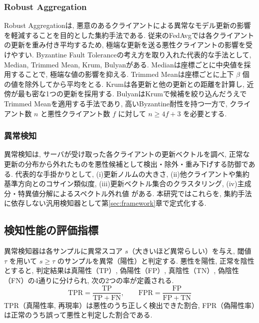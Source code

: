 \documentclass[a4j, twocolumn, dvipdfmx]{jsarticle}
\begin{document}
\subsubsection{Robust Aggregation}
Robust Aggregationは, 悪意のあるクライアントによる異常なモデル更新の影響を軽減することを目的とした集約手法である. 従来のFedAvgでは各クライアントの更新を重み付き平均するため, 極端な更新を送る悪性クライアントの影響を受けやすい. Byzantine Fault Toleranceの考え方を取り入れた代表的な手法として, Median, Trimmed Mean, Krum, Bulyanがある. Median\cite{yin2018byzantine}は座標ごとに中央値を採用することで, 極端な値の影響を抑える. Trimmed Mean\cite{yin2018byzantine}は座標ごとに上下 $\beta$ 個の値を除外してから平均をとる. Krum\cite{blanchard2017krum}は各更新と他の更新との距離を計算し, 近傍が最も密な1つの更新を採用する. Bulyan\cite{elmhamdi2018hidden}はKrumで候補を絞り込んだうえでTrimmed Meanを適用する手法であり, 高いByzantine耐性を持つ一方で, クライアント数 $n$ と悪性クライアント数 $f$ に対して $n \geq 4f+3$ を必要とする.

\subsubsection{異常検知}
異常検知は, サーバが受け取った各クライアントの更新ベクトルを調べ, 正常な更新の分布から外れたものを悪性候補として検出・除外・重み下げする防御である. 代表的な手掛かりとして, (i)更新ノルムの大きさ\cite{nguyen2022flame}, (ii)他クライアントや集約基準方向とのコサイン類似度\cite{nguyen2022flame}, (iii)更新ベクトル集合のクラスタリング\cite{shen2016auror,sattler2020byzantine}, (iv)主成分・特異値分解によるスペクトル外れ値\cite{tran2018spectral,shejwalkar2021manipulating} がある. 本研究ではこれらを, 集約手法に依存しない汎用検知器として第\ref{sec:framework}章で定式化する.

\subsection{検知性能の評価指標}
\label{sec:roc-auc}

異常検知器は各サンプルに異常スコア $s$（大きいほど異常らしい）を与え, 閾値 $\tau$ を用いて $s \geq \tau$ のサンプルを異常（陽性）と判定する. 悪性を陽性, 正常を陰性とすると, 判定結果は真陽性（TP）, 偽陽性（FP）, 真陰性（TN）, 偽陰性（FN）の4通りに分けられ, 次の2つの率が定義される.
\begin{equation}
\mathrm{TPR} = \frac{\mathrm{TP}}{\mathrm{TP}+\mathrm{FN}}, \qquad
\mathrm{FPR} = \frac{\mathrm{FP}}{\mathrm{FP}+\mathrm{TN}}
\end{equation}
TPR（真陽性率, 再現率）は悪性のうち正しく検出できた割合, FPR（偽陽性率）は正常のうち誤って悪性と判定した割合である.
\end{document}
